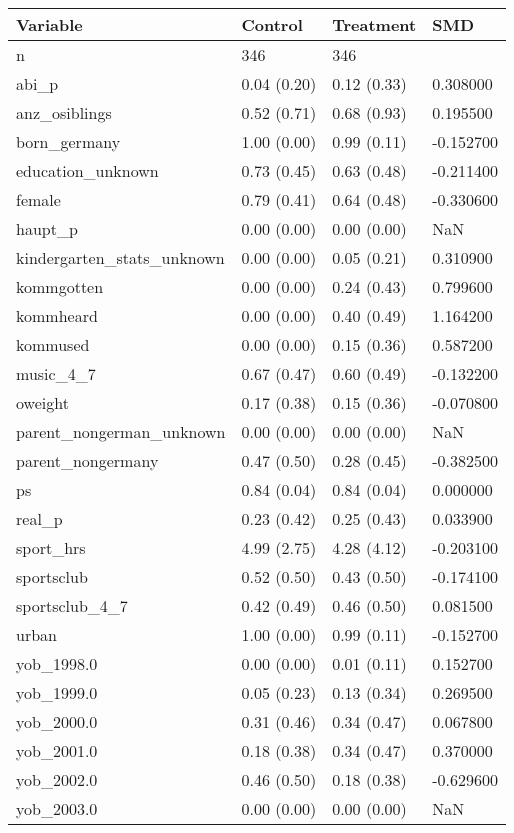 \begin{tabular}{llll}
\toprule
Variable & Control & Treatment & SMD \\
\midrule
n & 346 & 346 &  \\
abi\_p & 0.04 (0.20) & 0.12 (0.33) & 0.308000 \\
anz\_osiblings & 0.52 (0.71) & 0.68 (0.93) & 0.195500 \\
born\_germany & 1.00 (0.00) & 0.99 (0.11) & -0.152700 \\
education\_unknown & 0.73 (0.45) & 0.63 (0.48) & -0.211400 \\
female & 0.79 (0.41) & 0.64 (0.48) & -0.330600 \\
haupt\_p & 0.00 (0.00) & 0.00 (0.00) & NaN \\
kindergarten\_stats\_unknown & 0.00 (0.00) & 0.05 (0.21) & 0.310900 \\
kommgotten & 0.00 (0.00) & 0.24 (0.43) & 0.799600 \\
kommheard & 0.00 (0.00) & 0.40 (0.49) & 1.164200 \\
kommused & 0.00 (0.00) & 0.15 (0.36) & 0.587200 \\
music\_4\_7 & 0.67 (0.47) & 0.60 (0.49) & -0.132200 \\
oweight & 0.17 (0.38) & 0.15 (0.36) & -0.070800 \\
parent\_nongerman\_unknown & 0.00 (0.00) & 0.00 (0.00) & NaN \\
parent\_nongermany & 0.47 (0.50) & 0.28 (0.45) & -0.382500 \\
ps & 0.84 (0.04) & 0.84 (0.04) & 0.000000 \\
real\_p & 0.23 (0.42) & 0.25 (0.43) & 0.033900 \\
sport\_hrs & 4.99 (2.75) & 4.28 (4.12) & -0.203100 \\
sportsclub & 0.52 (0.50) & 0.43 (0.50) & -0.174100 \\
sportsclub\_4\_7 & 0.42 (0.49) & 0.46 (0.50) & 0.081500 \\
urban & 1.00 (0.00) & 0.99 (0.11) & -0.152700 \\
yob\_1998.0 & 0.00 (0.00) & 0.01 (0.11) & 0.152700 \\
yob\_1999.0 & 0.05 (0.23) & 0.13 (0.34) & 0.269500 \\
yob\_2000.0 & 0.31 (0.46) & 0.34 (0.47) & 0.067800 \\
yob\_2001.0 & 0.18 (0.38) & 0.34 (0.47) & 0.370000 \\
yob\_2002.0 & 0.46 (0.50) & 0.18 (0.38) & -0.629600 \\
yob\_2003.0 & 0.00 (0.00) & 0.00 (0.00) & NaN \\
\bottomrule
\end{tabular}
